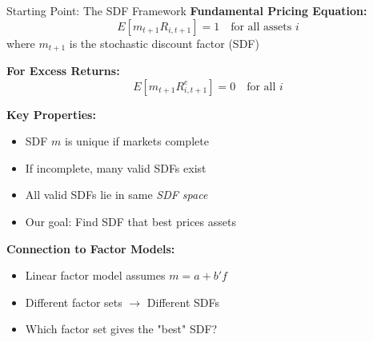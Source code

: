 \documentclass{beamer}
\begin{document}
\begin{frame}{Starting Point: The SDF Framework}
    \textbf{Fundamental Pricing Equation:}
    \begin{equation}\label{eq:sdf_basic}
        E[m_{t+1} R_{i,t+1}] = 1 \quad \text{for all assets } i
    \end{equation}
    where $m_{t+1}$ is the stochastic discount factor (SDF)
    
    \vspace{0.3cm}
    \textbf{For Excess Returns:}
    \begin{equation}\label{eq:sdf_excess}
        E[m_{t+1} R^e_{i,t+1}] = 0 \quad \text{for all } i
    \end{equation}
    
    \vspace{0.3cm}
    \textbf{Key Properties:}
    \begin{itemize}
        \item SDF $m$ is unique if markets complete
        \item If incomplete, many valid SDFs exist
        \item All valid SDFs lie in same \textit{SDF space}
        \item Our goal: Find SDF that best prices assets
    \end{itemize}
    
    
    \textbf{Connection to Factor Models:}
    \begin{itemize}
        \item Linear factor model assumes $m = a + b' f$
        \item Different factor sets $\rightarrow$ Different SDFs
        \item Which factor set gives the "best" SDF?
    \end{itemize}
\end{frame}
\end{document}
